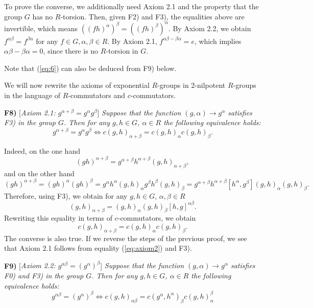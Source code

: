\documentclass[11pt]{article}
\theoremstyle{definition}
\begin{document}
To prove the converse, we additionally need Axiom 2.1 and the property that the group $G$ has no $R$-torsion. Then, given F2) and F3), the equalities above are invertible, which means $((fh)^\alpha)^\beta = ((fh)^\beta)^\alpha$. By Axiom 2.2, we obtain $f^{\alpha \beta} = f^{\beta \alpha }$ for any $f \in G, \alpha, \beta \in R$. By Axiom 2.1, $f^{\alpha\beta -\beta\alpha} = e$, which implies $\alpha\beta -\beta\alpha = 0$, since there is no $R$-torsion in $G$.

Note that (\ref{eq:6}) can also be deduced from F9) below.

We will now rewrite the axioms of exponential $R$-groups in 2-nilpotent $R$-groups in the language of $R$-commutators and $c$-commutators.

\medskip
\noindent
{\bf F8)} [{\it Axiom 2.1: $g^{\alpha+\beta} = g^{\alpha}g^{\beta}$}]
{\it Suppose that the function $(g,\alpha) \to g^\alpha$ satisfies F3) in the group $G$. Then for any $g, h \in G$, $\alpha \in R$ the following equivalence holds:
$$
g^{\alpha+\beta} = g^{\alpha}g^{\beta} \Longleftrightarrow c(g,h)_{\alpha +\beta} = c(g,h)_{\alpha}c(g,h)_{\beta}.
$$
}

Indeed, on the one hand
$$
(gh)^{\alpha+\beta}=g^{\alpha+\beta}h^{\alpha+\beta} (g,h)_{\alpha+\beta},
$$
and on the other hand
$$
(gh)^{\alpha+\beta}=(gh)^\alpha (gh)^{\beta}=g^\alpha h^\alpha (g,h)_\alpha g^\beta h^\beta (g,h)_\beta=g^{\alpha+\beta} h^{\alpha+\beta} [h^\alpha,g^\beta] (g,h)_\alpha (g,h)_\beta.
$$
Therefore, using F3), we obtain for any $g,h \in G$, $\alpha, \beta \in R$
\begin{equation}\label{eq:(1)}
(g,h)_{\alpha + \beta}=(g,h)_\alpha (g,h)_\beta [h,g]^{\alpha\beta}. \end{equation}
Rewriting this equality in terms of $c$-commutators, we obtain
\begin{equation} \label{eq:axiom2}
c(g,h)_{\alpha +\beta} = c(g,h)_{\alpha}c(g,h)_{\beta}.
\end{equation}
The converse is also true. If we reverse the steps of the previous proof, we see that Axiom 2.1 follows from equality (\ref{eq:axiom2}) and F3).

\medskip
\noindent
{\bf F9)} [{\it Axiom 2.2: $g^{\alpha \beta} = (g^{\alpha})^{\beta}$}]
{\it Suppose that the function $(g,\alpha) \to g^\alpha$ satisfies F0) and F3) in the group $G$. Then for any $g, h \in G$, $\alpha \in R$ the following equivalence holds:
$$
g^{\alpha \beta} = (g^{\alpha})^{\beta} \Longleftrightarrow c(g,h)_{\alpha\beta} = c(g^{\alpha},h^{\alpha})_\beta c(g,h)_{\alpha}^{\beta}
$$
}
\end{document}
